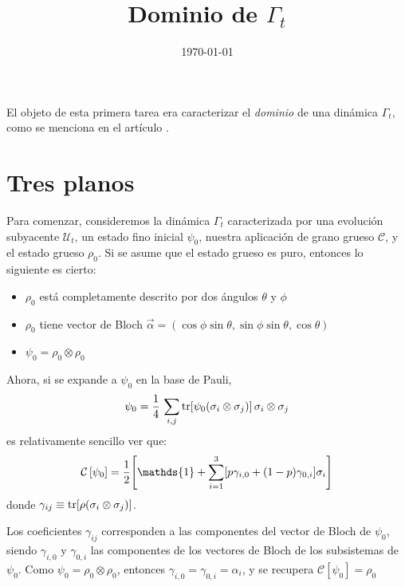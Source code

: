 \documentclass[onecolumn,11pt]{article}
\title{Dominio de $\Gamma_{t}$}
\date{\today}
\newcommand{\mcU}{\mathcal{U}}
\newcommand{\mcC}{\mathcal{C}}
\newcommand{\Id}{\mathds{1}}%
\newcommand{\CG}[1]{\mcC\left[#1\right]}
\begin{document}
\maketitle
\thispagestyle{empty}
El objeto de esta primera tarea era caracterizar el \textit{dominio} de una dinámica $\Gamma_{t}$, como se menciona en el artículo \cite{CGEmergingDynamics}.

\section{Tres planos}
Para comenzar, consideremos la dinámica  $\Gamma_{t}$ caracterizada por una evolución subyacente $\mcU_{
t}$, un estado fino inicial $\psi_{0}$, nuestra aplicación de grano grueso $\mcC$, y el estado grueso $\rho_{0}$. Si se asume que el estado grueso es puro, entonces lo siguiente es cierto:
\begin{itemize}
\item $\rho_{0}$ está completamente descrito por dos ángulos $\theta$ y $\phi$
\item $\rho_{0}$ tiene vector de Bloch $\vec{\alpha}=(\cos{\phi}\sin{\theta},\sin{\phi}\sin{\theta},\cos{\theta})$
\item $\psi_{0}=\rho_{0}\otimes\rho_{0}$
\end{itemize}
Ahora, si se expande a $\psi_{0}$ en la base de Pauli,
\begin{equation}
    \psi_{0} = \frac{1}{4}\,\sum_{i,j} \tr[\psi_{0}(\sigma_i \otimes \sigma_j)]\, \sigma_i\otimes\sigma_j
\end{equation}
es relativamente sencillo ver que:
\begin{equation}
    \CG{\psi_{0}} = \frac{1}{2}\qty[\Id + \sum_{i=1}^3[p\gamma_{i,0}+(1-p)\gamma_{0,i}]\sigma_i]
\end{equation}
donde $\gamma_{ij} \equiv \tr[\rho(\sigma_i \otimes\sigma_j)]$. 

Los coeficientes $\gamma_{ij}$ corresponden a las componentes del vector de Bloch de $\psi_{0}$, siendo $\gamma_{i,0}$ y $\gamma_{0,i}$ las componentes de los vectores de Bloch de los subsistemas de $\psi_{0}$. Como $\psi_{0}=\rho_{0}\otimes\rho_{0}$, entonces $\gamma_{i,0}=\gamma_{0,i}=\alpha_{i}$, y se recupera $\CG{\psi_{0}}=\rho_{0}$
\end{document}
